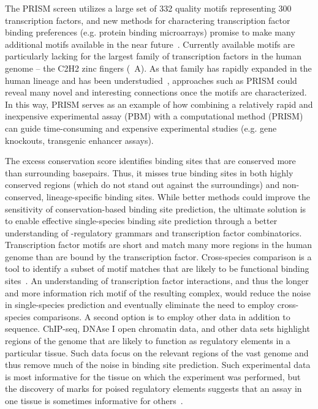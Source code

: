 The PRISM screen utilizes a large set of 332 quality motifs representing 300 transcription factors, and new methods for charactering
transcription factor binding preferences (e.g. protein binding microarrays) promise to make many additional
motifs available in the near future~\citep{Berger2008}.  Currently available motifs are particularly lacking for the largest
family of transcription factors in the human genome -- the C2H2 zinc fingers (~A).  As that family has rapidly
expanded in the human lineage and has been understudied~\citep{Emerson2009,Nowick2011}, approaches such as PRISM could reveal many
novel and interesting connections once the motifs are characterized.  In this way, PRISM serves as an
example of how combining a relatively rapid and inexpensive experimental assay (PBM) with a computational
method (PRISM) can guide time-consuming and expensive experimental studies (e.g. gene knockouts, transgenic enhancer assays).

The excess conservation score identifies binding sites that are conserved more than surrounding basepairs.
Thus, it misses true binding sites in both highly conserved regions (which do not stand out against
the surroundings) and non-conserved, lineage-specific binding sites.  While better methods could improve the
sensitivity of conservation-based binding site prediction, the ultimate solution is to enable
effective single-species binding site prediction through a better understanding of \cis-regulatory grammars and
transcription factor combinatorics.  Transcription factor motifs are short and match many more regions in the human genome
than are bound by the transcription factor.  Cross-species comparison is a tool to identify a subset of
motif matches that are likely to be functional binding sites~\citep{Xie2009}.  An understanding of transcription factor interactions,
and thus the longer and more information rich motif of the resulting complex, would reduce the noise in
single-species prediction and eventually eliminate the need to employ cross-species comparisons.  A second option is
to employ other data in addition to sequence.  ChIP-seq, DNAse I open chromatin data, and other data sets highlight
regions of the genome that are likely to function as regulatory elements in a particular tissue.  Such data focus
on the relevant regions of the vast genome and thus remove much of the noise in binding site prediction.  Such experimental
data is most informative for the tissue on which the experiment was performed, but the discovery of marks for poised
regulatory elements suggests that an assay in one tissue is sometimes informative for others~\citep{Cotney2012}.

